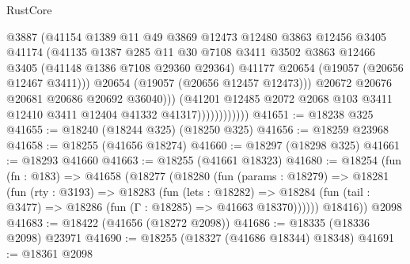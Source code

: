 \begin{lexlean}{RustCore}
\begin{coremodule}
                                @3887
                                (@41154
                                  @1389
                                  @11
                                  @49
                                  @3869
                                  @12473
                                  @12480
                                  @3863
                                  @12456
                                  @3405
                                  @41174
                                  (@41135
                                    @1387
                                    @285
                                    @11
                                    @30
                                    @7108
                                    @3411
                                    @3502
                                    @3863
                                    @12466
                                    @3405
                                    (@41148 @1386 @7108 @29360 @29364)
                                    @41177
                                    @20654
                                    (@19057 (@20656 @12467 @3411)))
                                  @20654
                                  (@19057 (@20656 @12457 @12473)))
                                @20672
                                @20676
                                @20681
                                @20686
                                @20692
                                @36040)))
                          (@41201
                            @12485
                            @2072
                            @2068
                            @103
                            @3411
                            @12410
                            @3411
                            @12404
                            @41332
                            @41317))))))))))))
@41651 := @18238 @325
@41655 := @18240 (@18244 @325) (@18250 @325)
@41656 := @18259 @23968
@41658 := @18255 (@41656 @18274)
@41660 := @18297 (@18298 @325)
@41661 := @18293 @41660
@41663 := @18255 (@41661 @18323)
@41680 := @18254
    (fun (fn : @183) =>
    @41658
      (@18277
        (@18280
          (fun (params : @18279) =>
          @18281
            (fun (rty : @3193) =>
            @18283
              (fun (lets : @18282) =>
              @18284 (fun (tail : @3477) => @18286 (fun (Γ : @18285) => @41663 @18370))))))
        @18416))
    @2098
@41683 := @18422 (@41656 (@18272 @2098))
@41686 := @18335 (@18336 @2098) @23971
@41690 := @18255 (@18327 (@41686 @18344) @18348)
@41691 := @18361 @2098

\end{coremodule}
\end{lexlean}
